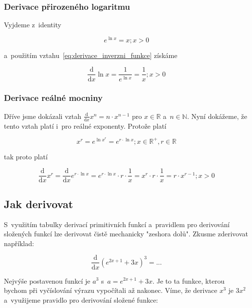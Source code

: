 \subsubsection{Derivace přirozeného logaritmu}

Vyjdeme z~identity

\begin{equation}
e^{\ln x} = x; x > 0
\end{equation}

a~použitím vztahu~\eqref{eq:derivace_inverzni_funkce} získáme

\begin{equation}
\frac{\mathrm{d}}{\mathrm{d}x} \ln x = \frac{1}{e^{\ln x}} = \frac{1}{x}; x > 0
\end{equation}

\subsubsection{Derivace reálné mocniny}

Dříve jsme dokázali vztah \(\frac{\mathrm{d}}{\mathrm{d}x} x^n = n \cdot x^{n-1}\) pro \(x \in \mathbb{R}\) a~\(n \in \mathbb{N}\). Nyní dokážeme, že tento vztah platí i~pro reálné exponenty. Protože platí

\begin{equation}
x^r = e^{\ln x^r} = e^{r \cdot \ln x}; x \in \mathbb{R}^+, r \in \mathbb{R}
\end{equation}

tak proto platí

\begin{equation}
\frac{\mathrm{d}}{\mathrm{d}x} x^r = \frac{\mathrm{d}}{\mathrm{d}x} e^{r \cdot \ln x} = e^{r \cdot \ln x} \cdot r \cdot \frac{1}{x} = x^r \cdot r \cdot \frac{1}{x} = r \cdot x^{r-1}; x > 0
\end{equation}


\subsection{Jak derivovat}

S~využitím tabulky derivací primitivních funkcí a~pravidlem pro derivování složených funkcí lze derivovat čistě mechanicky "zeshora dolů". Zkusme zderivovat například:

\begin{equation}
\frac{\mathrm{d}}{\mathrm{d}x} \left(e^{2x+1} + 3x \right)^3 = ...
\end{equation}

Nejvýše postavenou funkcí je \(a^3\) s~\(a = e^{2x+1} + 3x\). Je to ta funkce, kterou bychom při vyčíslování výrazu vypočítali až nakonec. Víme, že derivace \(x^3\) je \(3 x^2\) a~využijeme pravidlo pro derivování složené funkce:

